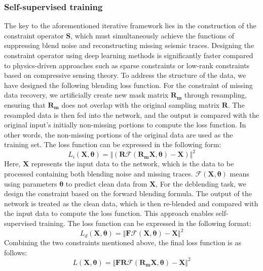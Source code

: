 \documentclass{segabs}
\begin{document}
\subsubsection{Self-supervised training}
The key to the aforementioned iterative framework lies in the construction of the constraint operator $\mathbf{S}$, which must simultaneously achieve the functions of suppressing blend noise and reconstructing missing seismic traces. Designing the constraint operator using deep learning methods is significantly faster compared to physics-driven approaches such as sparse constraints or low-rank constraints based on compressive sensing theory. To address the structure of the data, we have designed the following blending loss function.
For the constraint of missing data recovery, we artificially create new mask matrix $\mathbf{R_m}$ through resampling, ensuring that 
$\mathbf{R_m}$ does not overlap with the original sampling matrix $\mathbf{R}$. The resampled data is then fed into the network, and the output is compared with the original input's initially non-missing portions to compute the loss function. In other words, the non-missing portions of the original data are used as the training set. The loss function can be expressed in the following form:
\begin{equation}
\text{}{L}_{i}(\mathbf{X},\mathbf{\theta})= \Vert (\mathbf{R}\mathcal{F}(\mathbf{R_m} \mathbf{X},\mathbf{\theta}) - \mathbf{X})\Vert^{2}
\end{equation}
Here, $\mathbf{X}$ represents the input data to the network, which is the data to be processed containing both blending noise and missing traces. $\mathcal{F}(\mathbf{X},\mathbf{\theta})$ means using parameters $\mathbf{\theta}$ to predict clean data from $\mathbf{X}$, For the deblending task, we design the constraint based on the forward blending formula. The output of the network is treated as the clean data, which is then re-blended and compared with the input data to compute the loss function. This approach enables self-supervised training. The loss function can be expressed in the following format:
\begin{equation}
\text{}{L}_{d}(\mathbf{X},\mathbf{\theta})= \Vert \mathbf{F} \mathcal{F}(\mathbf{X},\mathbf{\theta}) - \mathbf{X}\Vert^{2}
\end{equation}
Combining the two constraints mentioned above, the final loss function is as follows:
\begin{equation}\label{lossf}
\text{}{L}(\mathbf{X},\mathbf{\theta})= \Vert \mathbf{F}\mathbf{R}\mathcal{F}(\mathbf{R_m}\mathbf{X},\mathbf{\theta}) - \mathbf{X}\Vert^{2}
\end{equation}
\end{document}

